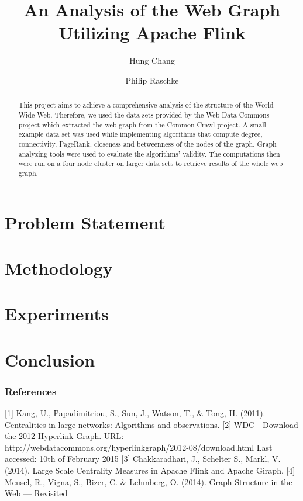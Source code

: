 \documentclass{article} %
\title{An Analysis of the Web Graph Utilizing Apache Flink}
\author{
Hung Chang \\
\and
Philip Raschke
}
\begin{document}
\maketitle

\begin{abstract}
This project aims to achieve a comprehensive analysis of the structure of the World-Wide-Web. Therefore, we used the data sets provided by the Web Data Commons project which extracted the web graph from the Common Crawl project. A small example data set was used while implementing algorithms that compute degree, connectivity, PageRank, closeness and betweenness of the nodes of the graph. Graph analyzing tools were used to evaluate the algorithms' validity. The computations then were run on a four node cluster on larger data sets to retrieve results of the whole web graph.
\end{abstract}

\section{Problem Statement}


\section{Methodology}


\section{Experiments}


\section{Conclusion}


\subsubsection*{References}

\small{
	[1] Kang, U., Papadimitriou, S., Sun, J., Watson, T., \& Tong, H. (2011). Centralities in large networks: Algorithms and observations. 
	[2] WDC - Download the 2012 Hyperlink Graph. URL: http://webdatacommons.org/hyperlinkgraph/2012-08/download.html Last accessed: 10th of February 2015
	[3] Chakkaradhari, J., Schelter S., Markl, V. (2014). Large Scale Centrality Measures in Apache Flink and Apache Giraph.
	[4] Meusel, R., Vigna, S., Bizer, C. \& Lehmberg, O. (2014). Graph Structure in the Web — Revisited
}
\end{document}
